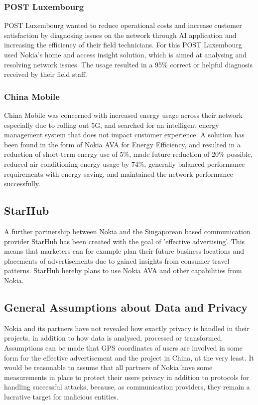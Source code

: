 \documentclass[a4paper,12pt]{report}
\begin{document}
			\subsubsection{POST Luxembourg}
				POST Luxembourg wanted to reduce operational costs and increase customer satisfaction by diagnosing issues on the network through AI application and increasing the efficiency of their field technicians.
			For this POST Luxembourg used Nokia's home and access insight solution, which is aimed at analysing and resolving network issues. The usage resulted in a 95\% correct or helpful diagnosis received by their field staff.
			\subsubsection{China Mobile}
				China Mobile was concerned with increased energy usage across their network especially due to rolling out 5G, and searched for an intelligent energy management system that does not impact customer experience.
				A solution has been found in the form of Nokia AVA for Energy Efficiency, and resulted in a reduction of short-term energy use of 5\%, made future reduction of 20\% possible, reduced air conditioning energy usage by 74\%, generally balanced performance requirements with energy saving, and maintained the network performance successfully.
		\closesection	
		\subsection[StarHub]{StarHub \cite{StarhubNokia}}
		\startsubsection
			A further partnership between Nokia and the Singaporean based communication provider StarHub has been created with the goal of 'effective advertising'. This means that marketers can for example plan their future business locations and placements of advertisements due to gained insights from consumer travel patterns. StarHub hereby plans to use Nokia AVA and other capabilities from Nokia. 
		\closesection
		\subsection{General Assumptions about Data and Privacy}
		\startsubsection
		Nokia and its partners have not revealed how exactly privacy is handled in their projects, in addition to how data is analysed, processed or transformed. Assumptions can be made that GPS coordinates of users are involved in some form for the effective advertisement and the project in China, at the very least. It would be reasonable to assume that all partners of Nokia have some measurements in place to protect their users privacy in addition to protocols for handling successful attacks, because, as communication providers, they remain a lucrative target for malicious entities.
		\closesection		
	\closesection
	
\end{document}
